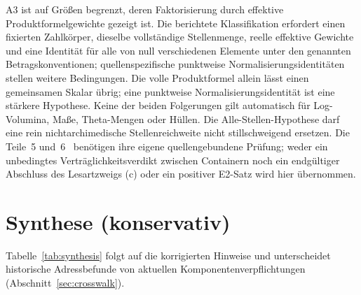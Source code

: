 \documentclass[11pt,a4paper]{article}
\begin{document}
A3 ist auf Größen begrenzt, deren Faktorisierung durch effektive
Produktformelgewichte gezeigt ist. Die berichtete Klassifikation
erfordert einen fixierten Zahlkörper, dieselbe vollständige
Stellenmenge, reelle effektive Gewichte und eine Identität für alle
von null verschiedenen Elemente unter den genannten Betragskonventionen;
quellenspezifische punktweise Normalisierungsidentitäten stellen
weitere Bedingungen. Die volle Produktformel allein lässt einen
gemeinsamen Skalar übrig; eine punktweise Normalisierungsidentität
ist eine stärkere Hypothese. Keine der beiden Folgerungen gilt
automatisch für Log-Volumina, Maße, Theta-Mengen oder Hüllen.
Die Alle-Stellen-Hypothese darf eine rein nichtarchimedische
Stellenreichweite nicht stillschweigend ersetzen. Die
Teile~5 und~6~\cite{part5,part6} benötigen ihre eigene
quellengebundene Prüfung; weder ein unbedingtes Verträglichkeitsverdikt
zwischen Containern noch ein endgültiger Abschluss des Lesartzweigs
(c) oder ein positiver E2-Satz wird hier übernommen.

\section{Synthese (konservativ)}\label{sec:synthesis}

Tabelle~\ref{tab:synthesis} folgt auf die korrigierten Hinweise
und unterscheidet historische Adressbefunde von aktuellen
Komponentenverpflichtungen (Abschnitt~\ref{sec:crosswalk}).
\end{document}
